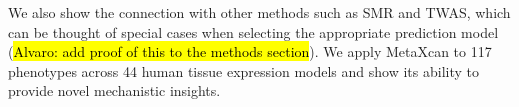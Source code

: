 \documentclass[10pt]{article}
\begin{document}
We also show the connection with other methods such as SMR and TWAS, which can be thought of special cases when selecting the appropriate prediction model (\hl{Alvaro: add proof of this to the methods section}). We apply MetaXcan to 117 phenotypes across 44 human tissue expression models and show its ability to provide novel mechanistic insights.







\end{document}
